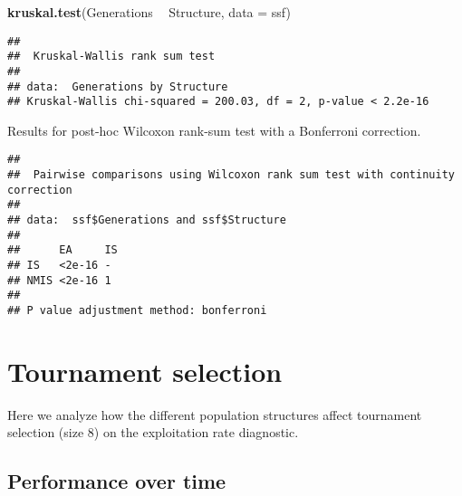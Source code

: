 \documentclass[]{book}
\newenvironment{Shaded}{\begin{snugshade}}{\end{snugshade}}
\newcommand{\DataTypeTok}[1]{\textcolor[rgb]{0.13,0.29,0.53}{#1}}
\newcommand{\KeywordTok}[1]{\textcolor[rgb]{0.13,0.29,0.53}{\textbf{#1}}}
\newcommand{\NormalTok}[1]{#1}
\newcommand{\OperatorTok}[1]{\textcolor[rgb]{0.81,0.36,0.00}{\textbf{#1}}}
\newcommand{\OtherTok}[1]{\textcolor[rgb]{0.56,0.35,0.01}{#1}}
\newcommand{\StringTok}[1]{\textcolor[rgb]{0.31,0.60,0.02}{#1}}
\begin{document}
\begin{Shaded}
\begin{Highlighting}[]
\KeywordTok{kruskal.test}\NormalTok{(Generations }\OperatorTok{~}\StringTok{ }\NormalTok{Structure, }\DataTypeTok{data =}\NormalTok{ ssf)}
\end{Highlighting}
\end{Shaded}

\begin{verbatim}
## 
##  Kruskal-Wallis rank sum test
## 
## data:  Generations by Structure
## Kruskal-Wallis chi-squared = 200.03, df = 2, p-value < 2.2e-16
\end{verbatim}

Results for post-hoc Wilcoxon rank-sum test with a Bonferroni correction.

\begin{Shaded}
\end{Shaded}

\begin{verbatim}
## 
##  Pairwise comparisons using Wilcoxon rank sum test with continuity correction 
## 
## data:  ssf$Generations and ssf$Structure 
## 
##      EA     IS
## IS   <2e-16 - 
## NMIS <2e-16 1 
## 
## P value adjustment method: bonferroni
\end{verbatim}

\hypertarget{tournament-selection-8}{%
\section{Tournament selection}\label{tournament-selection-8}}

Here we analyze how the different population structures affect tournament selection (size 8) on the exploitation rate diagnostic.

\hypertarget{performance-over-time-19}{%
\subsection{Performance over time}\label{performance-over-time-19}}
\end{document}
